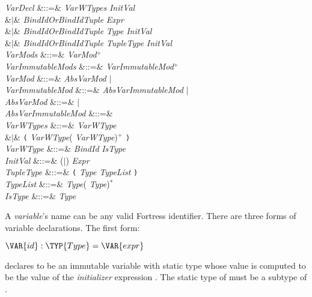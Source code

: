 \begin{Grammar}
\emph{VarDecl}
&::=&  \emph{VarWTypes} \emph{InitVal} \\
&$|$&  \emph{BindIdOrBindIdTuple} \EXP{=} \emph{Expr}\\
&$|$&  \emph{BindIdOrBindIdTuple} \EXP{\mathrel{\mathtt{:}}} \emph{Type}
\emph{InitVal} \\
&$|$&  \emph{BindIdOrBindIdTuple} \EXP{\mathrel{\mathtt{:}}} \emph{TupleType}
\emph{InitVal} \\

\emph{VarMods} &::=& \emph{VarMod}$^+$\\

\emph{VarImmutableMods} &::=& \emph{VarImmutableMod}$^+$\\

\emph{VarMod} &::=& \emph{AbsVarMod} $|$ \\

\emph{VarImmutableMod} &::=& \emph{AbsVarImmutableMod} $|$ \\

\emph{AbsVarMod} &::=&  $|$ \\

\emph{AbsVarImmutableMod} &::=& \\

\emph{VarWTypes} &::=& \emph{VarWType} \\
&$|$& \texttt{(} \emph{VarWType}(\EXP{,} \emph{VarWType})$^+$ \texttt{)}\\

\emph{VarWType} &::=& \emph{BindId} \emph{IsType}\\

\emph{InitVal} &::=& (\EXP{=}$|$\EXP{\ASSIGN}) \emph{Expr} \\

\emph{TupleType} &::=&
\texttt{(} \emph{Type}\EXP{,} \emph{TypeList} \texttt{)}\\

\emph{TypeList} &::=& \emph{Type}(\EXP{,} \emph{Type})$^*$ \\

\emph{IsType} &::=& \EXP{\mathrel{\mathtt{:}}} \emph{Type}\\
\end{Grammar}

A \emph{variable}'s name can be any valid Fortress identifier.
There are three forms of variable declarations.  The first form:
\begin{Fortress}
\(\VAR{id} \mathrel{\mathtt{:}} \TYP{Type} = \VAR{expr}\)
\end{Fortress}
declares  to be an immutable variable with static type 
whose value is computed to be the value of the \emph{initializer} expression
.
The static type of  must be a subtype of .


